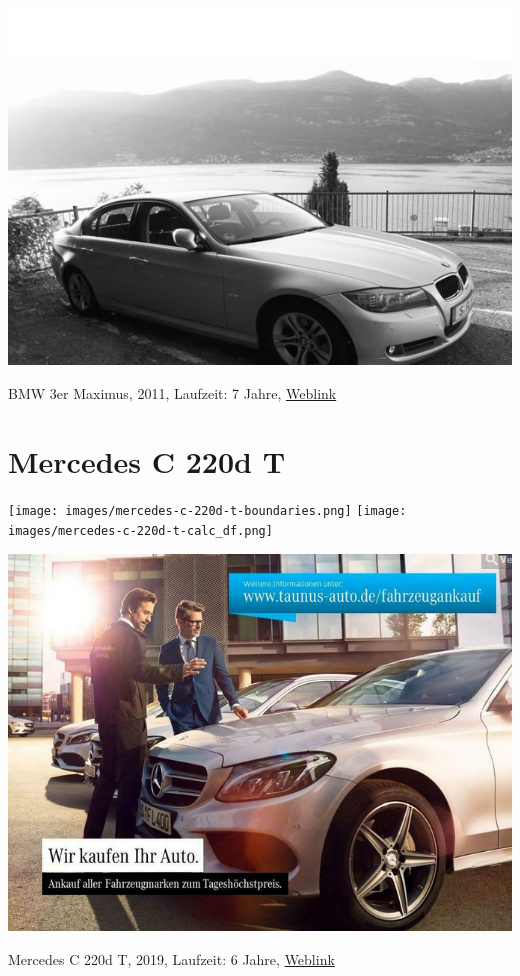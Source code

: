 \documentclass[landscape, DIV=99, 14pt]{scrartcl}
\begin{document}
\pagebreak
\null
\vspace{2cm}
\begin{center}
\includegraphics[width=0.9\columnwidth]{cars/bmw-3er-maximus.png}

BMW 3er Maximus, 2011, Laufzeit: 7 Jahre, \href{https://de.wikipedia.org/wiki/BMW_E90}{Weblink}
\end{center}

\pagebreak


\twocolumn

\section*{Mercedes C 220d T}
\begin{center}
\texttt{[image: images/mercedes-c-220d-t-boundaries.png]}
\null
\vspace{0.5cm}
\texttt{[image: images/mercedes-c-220d-t-calc\_df.png]}
\end{center}

\pagebreak
\null
\vspace{2cm}
\begin{center}
\includegraphics[width=0.9\columnwidth]{cars/mercedes-c-220d-t.png}

Mercedes C 220d T, 2019, Laufzeit: 6 Jahre, \href{https://suchen.mobile.de/fahrzeuge/details.html?action=parkItem&id=336723447}{Weblink}
\end{center}
\end{document}
